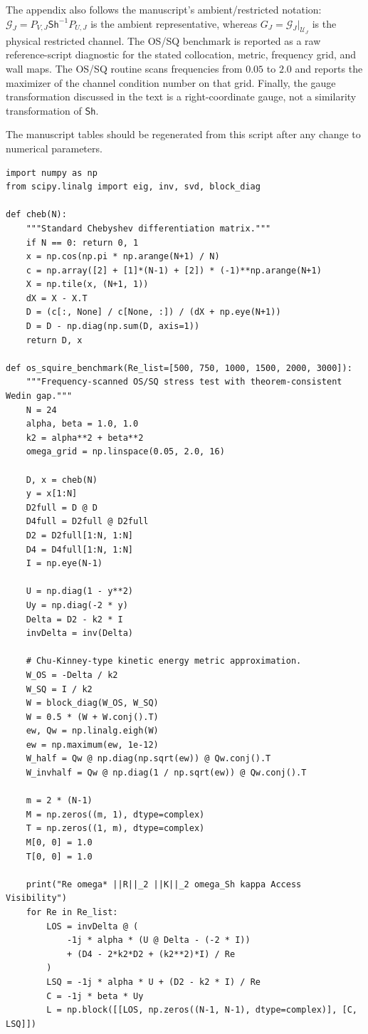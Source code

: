 \documentclass[review]{siamart220329}
\theoremstyle{definition}
\theoremstyle{remark}
\newcommand{\calU}{\mathcal{U}}
\newcommand{\Sh}{\mathsf{Sh}}
\begin{document}
The appendix also follows the manuscript's ambient/restricted notation:
$\mathcal G_J=P_{V,J}\Sh^{-1}P_{U,J}$ is the ambient representative, whereas
$G_J=\mathcal G_J|_{\calU_J}$ is the physical restricted channel. The OS/SQ
benchmark is reported as a raw reference-script diagnostic for the stated
collocation, metric, frequency grid, and wall maps. The OS/SQ routine scans
frequencies from $0.05$ to $2.0$ and reports the maximizer of the channel
condition number on that grid. Finally, the gauge transformation discussed in
the text is a right-coordinate gauge, not a similarity transformation of $\Sh$.


The manuscript tables should be regenerated from this script after any change to numerical parameters.

\begin{verbatim}
import numpy as np
from scipy.linalg import eig, inv, svd, block_diag

def cheb(N):
    """Standard Chebyshev differentiation matrix."""
    if N == 0: return 0, 1
    x = np.cos(np.pi * np.arange(N+1) / N)
    c = np.array([2] + [1]*(N-1) + [2]) * (-1)**np.arange(N+1)
    X = np.tile(x, (N+1, 1))
    dX = X - X.T
    D = (c[:, None] / c[None, :]) / (dX + np.eye(N+1))
    D = D - np.diag(np.sum(D, axis=1))
    return D, x

def os_squire_benchmark(Re_list=[500, 750, 1000, 1500, 2000, 3000]):
    """Frequency-scanned OS/SQ stress test with theorem-consistent Wedin gap."""
    N = 24
    alpha, beta = 1.0, 1.0
    k2 = alpha**2 + beta**2
    omega_grid = np.linspace(0.05, 2.0, 16)

    D, x = cheb(N)
    y = x[1:N]
    D2full = D @ D
    D4full = D2full @ D2full
    D2 = D2full[1:N, 1:N]
    D4 = D4full[1:N, 1:N]
    I = np.eye(N-1)

    U = np.diag(1 - y**2)
    Uy = np.diag(-2 * y)
    Delta = D2 - k2 * I
    invDelta = inv(Delta)

    # Chu-Kinney-type kinetic energy metric approximation.
    W_OS = -Delta / k2
    W_SQ = I / k2
    W = block_diag(W_OS, W_SQ)
    W = 0.5 * (W + W.conj().T)
    ew, Qw = np.linalg.eigh(W)
    ew = np.maximum(ew, 1e-12)
    W_half = Qw @ np.diag(np.sqrt(ew)) @ Qw.conj().T
    W_invhalf = Qw @ np.diag(1 / np.sqrt(ew)) @ Qw.conj().T

    m = 2 * (N-1)
    M = np.zeros((m, 1), dtype=complex)
    T = np.zeros((1, m), dtype=complex)
    M[0, 0] = 1.0
    T[0, 0] = 1.0

    print("Re omega* ||R||_2 ||K||_2 omega_Sh kappa Access Visibility")
    for Re in Re_list:
        LOS = invDelta @ (
            -1j * alpha * (U @ Delta - (-2 * I))
            + (D4 - 2*k2*D2 + (k2**2)*I) / Re
        )
        LSQ = -1j * alpha * U + (D2 - k2 * I) / Re
        C = -1j * beta * Uy
        L = np.block([[LOS, np.zeros((N-1, N-1), dtype=complex)], [C, LSQ]])


\end{verbatim}
\end{document}
